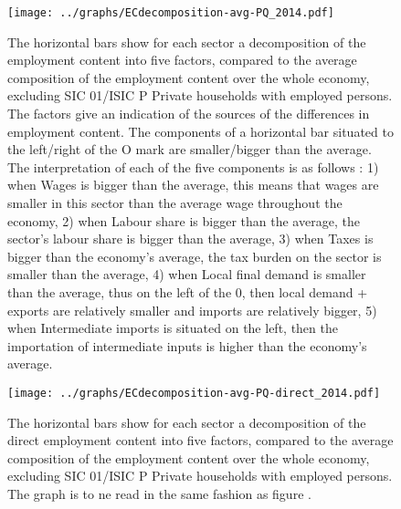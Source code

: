 \documentclass[12pt,english]{article}
\begin{document}
\begin{figure}[!ht]
	\centering
	\texttt{[image: ../graphs/ECdecomposition-avg-PQ\_2014.pdf]}
	\caption{\footnotesize \label{Decomposition_PQ}The horizontal bars show for each sector a decomposition of the employment content into five factors, compared to the average composition of the employment content over the whole economy, excluding SIC 01/ISIC P Private households with employed persons. The factors give an indication of the sources of the differences in employment content. The components of a horizontal bar situated to the left/right of the O mark are smaller/bigger than the average. The interpretation of each of the five components is as follows : 1) when Wages is bigger than the average, this means that wages are smaller in this sector than the average wage throughout the economy, 2) when Labour share is bigger than the average, the sector's labour share is bigger than the average, 3) when Taxes is bigger than the economy's average, the tax burden on the sector is smaller than the average, 4) when Local final demand is smaller than the average, thus on the left of the 0, then local demand + exports are relatively smaller and imports are relatively bigger, 5) when Intermediate imports is situated on the left, then the importation of intermediate inputs is higher than the economy's average.}
\end{figure}	


\begin{figure}[!ht]
	\centering
	\texttt{[image: ../graphs/ECdecomposition-avg-PQ-direct\_2014.pdf]}
	\caption{\footnotesize \label{Decomposition_PQ_direct}The horizontal bars show for each sector a decomposition of the direct employment content into five factors, compared to the average composition of the employment content over the whole economy, excluding SIC 01/ISIC P Private households with employed persons. The graph is to ne read in the same fashion as figure \label{Decomposition_PQ}. %
	}
\end{figure}	
\end{document}
